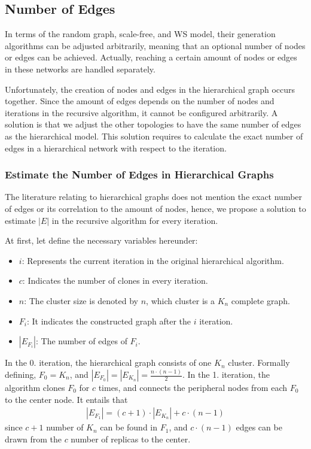 \subsection{Number of Edges}

In terms of the random graph, scale-free, and WS model, their generation algorithms can be adjusted arbitrarily, meaning that an optional number of nodes or edges can be achieved. Actually, reaching a certain amount of nodes or edges in these networks are handled separately.

Unfortunately, the creation of nodes and edges in the hierarchical graph occurs together. Since the amount of edges depends on the number of nodes and iterations in the recursive algorithm, it cannot be configured arbitrarily. A solution is that we adjust the other topologies to have the same number of edges as the hierarchical model. This solution requires to calculate the exact number of edges in a hierarchical network with respect to the iteration.

\subsubsection{Estimate the Number of Edges in Hierarchical Graphs}

The literature relating to hierarchical graphs does not mention the exact number of edges or its correlation to the amount of nodes, hence, we propose a solution to estimate $|E|$ in the recursive algorithm for every iteration.

At first, let define the necessary variables hereunder:
\begin{itemize}
	\item{$i$}: Represents the current iteration in the original hierarchical algorithm.
	\item{$c$}: Indicates the number of clones in every iteration.
	\item{$n$}: The cluster size is denoted by $n$, which cluster is a $K_n$ complete graph. %
	\item{$F_i$}: It indicates the constructed graph after the $i$ iteration. %
	\item{$|E_{F_i}|$}: The number of edges of $F_i$.
\end{itemize}

In the 0. iteration, the hierarchical graph consists of one $K_n$ cluster. Formally defining, $F_0 = K_n$, and $|E_{F_0}| = |E_{K_n}| = \frac{n \cdot (n-1)}{2}$. In the 1. iteration, the algorithm clones $F_0$ for $c$ times, and connects the peripheral nodes from each $F_0$ to the center node. It entails that 
\begin{align}\label{eq:f1_version1}
	|E_{F_1}| = (c+1) \cdot |E_{K_n}| + c \cdot (n - 1)	
\end{align}
since $c+1$ number of $K_n$ can be found in $F_1$, and $c \cdot (n - 1)$ edges can be drawn from the $c$ number of replicas to the center.

